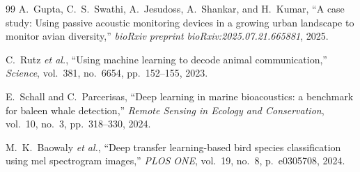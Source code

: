 \documentclass[conference]{IEEEtran}
\begin{document}
\begin{thebibliography}{99}
A.~Gupta, C.~S.~Swathi, A.~Jesudoss, A.~Shankar, and H.~Kumar, ``A case study: Using passive acoustic monitoring devices in a growing urban landscape to monitor avian diversity,'' \textit{bioRxiv preprint bioRxiv:2025.07.21.665881}, 2025.

C.~Rutz \textit{et al.}, ``Using machine learning to decode animal communication,'' \textit{Science}, vol.~381, no.~6654, pp.~152--155, 2023.

E.~Schall and C.~Parcerisas, ``Deep learning in marine bioacoustics: a benchmark for baleen whale detection,'' \textit{Remote Sensing in Ecology and Conservation}, vol.~10, no.~3, pp.~318--330, 2024.

M.~K.~Baowaly \textit{et al.}, ``Deep transfer learning-based bird species classification using mel spectrogram images,'' \textit{PLOS ONE}, vol.~19, no.~8, p.~e0305708, 2024.

\end{thebibliography}
\end{document}

